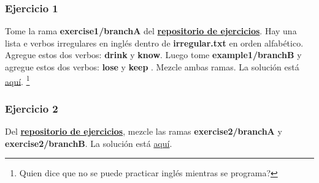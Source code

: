 \subsubsection{Ejercicio 1}
Tome la rama {\bf exercise1/branchA } del \hyperref[exercises_repo]{\bf repositorio de ejercicios}. Hay una lista
e verbos irregulares en inglés dentro de {\bf irregular.txt} en orden alfabético. Agregue estos dos verbos: {\bf drink} y {\bf know}.
Luego tome {\bf example1/branchB } y agregue estos dos verbos: {\bf lose } y {\bf keep }. Mezcle ambas ramas. La solución está
\hyperref[exercise_01]{aquí}. \footnote{ Quien dice que no se puede practicar inglés mientras se programa? }

\subsubsection{Ejercicio 2}
Del \hyperref[exercises_repo]{\bf repositorio de ejercicios}, mezcle las ramas {\bf exercise2/branchA} y {\bf exercise2/branchB}.
La solución está \hyperref[exercise_02]{aquí}.
